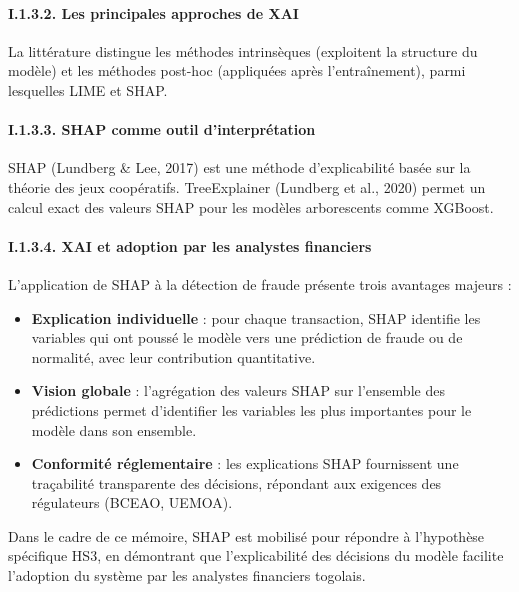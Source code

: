 \documentclass[
  12pt,
]{article}
\providecommand{\tightlist}{%
  \setlength{\itemsep}{0pt}\setlength{\parskip}{0pt}}
\begin{document}
\paragraph{I.1.3.2. Les principales approches de
XAI}\label{i.1.3.2.-les-principales-approches-de-xai}

La littérature distingue les méthodes intrinsèques (exploitent la
structure du modèle) et les méthodes post-hoc (appliquées après
l’entraînement), parmi lesquelles LIME et SHAP.

\paragraph{I.1.3.3. SHAP comme outil
d’interprétation}\label{i.1.3.3.-shap-comme-outil-dinterpruxe9tation}

SHAP (Lundberg \& Lee, 2017) est une méthode d’explicabilité basée sur
la théorie des jeux coopératifs. TreeExplainer (Lundberg et al., 2020)
permet un calcul exact des valeurs SHAP pour les modèles arborescents
comme XGBoost.

\paragraph{I.1.3.4. XAI et adoption par les analystes
financiers}\label{i.1.3.4.-xai-et-adoption-par-les-analystes-financiers}

L’application de SHAP à la détection de fraude présente trois avantages
majeurs :

\begin{itemize}
\tightlist
\item
  \textbf{Explication individuelle} : pour chaque transaction, SHAP
  identifie les variables qui ont poussé le modèle vers une prédiction
  de fraude ou de normalité, avec leur contribution quantitative.
\item
  \textbf{Vision globale} : l’agrégation des valeurs SHAP sur l’ensemble
  des prédictions permet d’identifier les variables les plus importantes
  pour le modèle dans son ensemble.
\item
  \textbf{Conformité réglementaire} : les explications SHAP fournissent
  une traçabilité transparente des décisions, répondant aux exigences
  des régulateurs (BCEAO, UEMOA).
\end{itemize}

Dans le cadre de ce mémoire, SHAP est mobilisé pour répondre à
l’hypothèse spécifique HS3, en démontrant que l’explicabilité des
décisions du modèle facilite l’adoption du système par les analystes
financiers togolais.
\end{document}
